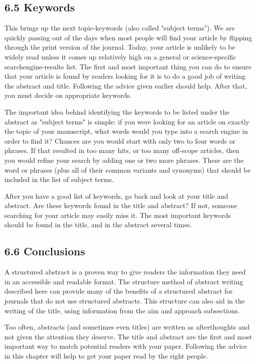 \subsection*{6.5 Keywords}
This brings up the next topic-keywords (also called "subject terms"). We are quickly passing out of the days when most people will find your article by flipping through the print version of the journal. Today, your article is unlikely to be widely read unless it comes up relatively high on a general or science-specific searchengine-results list. The first and most important thing you can do to ensure that your article is found by readers looking for it is to do a good job of writing the abstract and title. Following the advice given earlier should help. After that, you must decide on appropriate keywords.

The important idea behind identifying the keywords to be listed under the abstract as "subject terms" is simple: if you were looking for an article on exactly the topic of your manuscript, what words would you type into a search engine in order to find it? Chances are you would start with only two to four words or phrases. If that resulted in too many hits, or too many off-scope articles, then you would refine your search by adding one or two more phrases. These are the word or phrases (plus all of their common variants and synonyms) that should be included in the list of subject terms.

After you have a good list of keywords, go back and look at your title and abstract. Are these keywords found in the title and abstract? If not, someone searching for your article may easily miss it. The most important keywords should be found in the title, and in the abstract several times.

\subsection*{6.6 Conclusions}
A structured abstract is a proven way to give readers the information they need in an accessible and readable format. The structure method of abstract writing described here can provide many of the benefits of a structured abstract for journals that do not use structured abstracts. This structure can also aid in the writing of the title, using information from the aim and approach subsections.

Too often, abstracts (and sometimes even titles) are written as afterthoughts and not given the attention they deserve. The title and abstract are the first and most important way to match potential readers with your paper. Following the advice in this chapter will help to get your paper read by the right people.

